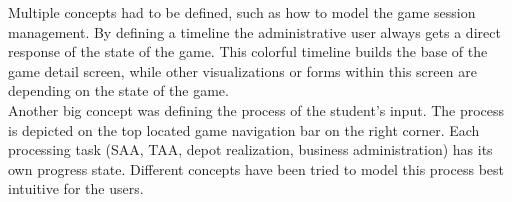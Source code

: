Multiple concepts had to be defined, such as how to model the game session management. By defining a timeline the administrative user always gets a direct response of the state of the game. This colorful timeline builds the base of the game detail screen, while other visualizations or forms within this screen are depending on the state of the game.\\

Another big concept was defining the process of the student's input. The process is depicted on the top located game navigation bar on the right corner. Each processing task (SAA, TAA, depot realization, business administration) has its own progress state. Different concepts have been tried to model this process best intuitive for the users.
